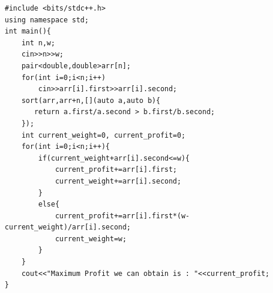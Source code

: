 \documentclass[10pt]{article}
\begin{document}
\begin{lstlisting}
#include <bits/stdc++.h>
using namespace std;
int main(){
    int n,w;
    cin>>n>>w;
    pair<double,double>arr[n];
    for(int i=0;i<n;i++)
        cin>>arr[i].first>>arr[i].second;
    sort(arr,arr+n,[](auto a,auto b){
       return a.first/a.second > b.first/b.second; 
    });
    int current_weight=0, current_profit=0;
    for(int i=0;i<n;i++){
        if(current_weight+arr[i].second<=w){
            current_profit+=arr[i].first;
            current_weight+=arr[i].second;
        }
        else{
            current_profit+=arr[i].first*(w-current_weight)/arr[i].second;
            current_weight=w;
        }
    }
    cout<<"Maximum Profit we can obtain is : "<<current_profit;
}
\end{lstlisting}
\clearpage

	
\end{document}
